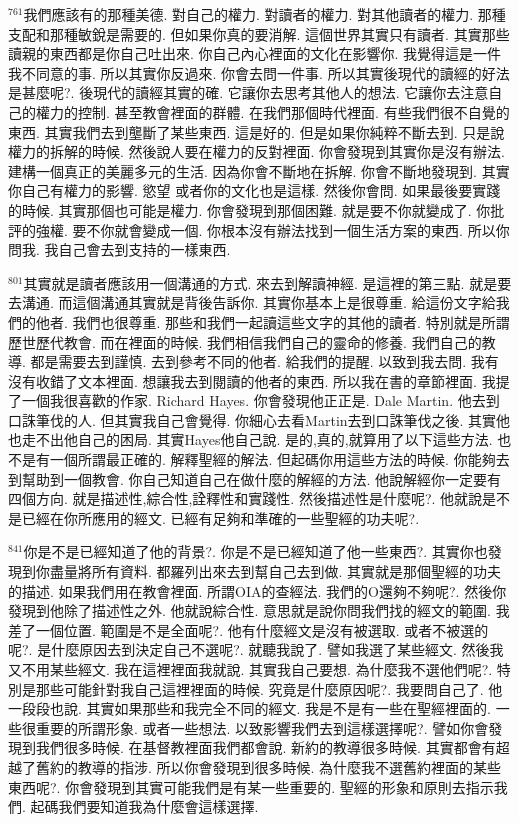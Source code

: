 \documentclass{book}
\begin{document}
$^{761}$我們應該有的那種美德.
對自己的權力.
對讀者的權力.
對其他讀者的權力.
那種支配和那種敏銳是需要的.
但如果你真的要消解.
這個世界其實只有讀者.
其實那些讀親的東西都是你自己吐出來.
你自己內心裡面的文化在影響你.
我覺得這是一件我不同意的事.
所以其實你反過來.
你會去問一件事.
所以其實後現代的讀經的好法是甚麼呢?.
後現代的讀經其實的確.
它讓你去思考其他人的想法.
它讓你去注意自己的權力的控制.
甚至教會裡面的群體.
在我們那個時代裡面.
有些我們很不自覺的東西.
其實我們去到壟斷了某些東西.
這是好的.
但是如果你純粹不斷去到.
只是說權力的拆解的時候.
然後說人要在權力的反對裡面.
你會發現到其實你是沒有辦法.
建構一個真正的美麗多元的生活.
因為你會不斷地在拆解.
你會不斷地發現到.
其實你自己有權力的影響.
慾望 或者你的文化也是這樣.
然後你會問.
如果最後要實踐的時候.
其實那個也可能是權力.
你會發現到那個困難.
就是要不你就變成了.
你批評的強權.
要不你就會變成一個.
你根本沒有辦法找到一個生活方案的東西.
所以你問我.
我自己會去到支持的一樣東西.

$^{801}$其實就是讀者應該用一個溝通的方式.
來去到解讀神經.
是這裡的第三點.
就是要去溝通.
而這個溝通其實就是背後告訴你.
其實你基本上是很尊重.
給這份文字給我們的他者.
我們也很尊重.
那些和我們一起讀這些文字的其他的讀者.
特別就是所謂歷世歷代教會.
而在裡面的時候.
我們相信我們自己的靈命的修養.
我們自己的教導.
都是需要去到謹慎.
去到參考不同的他者.
給我們的提醒.
以致到我去問.
我有沒有收錯了文本裡面.
想讓我去到閱讀的他者的東西.
所以我在書的章節裡面.
我提了一個我很喜歡的作家.
Richard Hayes.
你會發現他正正是.
Dale Martin.
他去到口誅筆伐的人.
但其實我自己會覺得.
你細心去看Martin去到口誅筆伐之後.
其實他也走不出他自己的困局.
其實Hayes他自己說.
是的,真的,就算用了以下這些方法.
也不是有一個所謂最正確的.
解釋聖經的解法.
但起碼你用這些方法的時候.
你能夠去到幫助到一個教會.
你自己知道自己在做什麼的解經的方法.
他說解經你一定要有四個方向.
就是描述性,綜合性,詮釋性和實踐性.
然後描述性是什麼呢?.
他就說是不是已經在你所應用的經文.
已經有足夠和準確的一些聖經的功夫呢?.

$^{841}$你是不是已經知道了他的背景?.
你是不是已經知道了他一些東西?.
其實你也發現到你盡量將所有資料.
都羅列出來去到幫自己去到做.
其實就是那個聖經的功夫的描述.
如果我們用在教會裡面.
所謂OIA的查經法.
我們的O還夠不夠呢?.
然後你發現到他除了描述性之外.
他就說綜合性.
意思就是說你問我們找的經文的範圍.
我差了一個位置.
範圍是不是全面呢?.
他有什麼經文是沒有被選取.
或者不被選的呢?.
是什麼原因去到決定自己不選呢?.
就聽我說了.
譬如我選了某些經文.
然後我又不用某些經文.
我在這裡裡面我就說.
其實我自己要想.
為什麼我不選他們呢?.
特別是那些可能針對我自己這裡裡面的時候.
究竟是什麼原因呢?.
我要問自己了.
他一段段也說.
其實如果那些和我完全不同的經文.
我是不是有一些在聖經裡面的.
一些很重要的所謂形象.
或者一些想法.
以致影響我們去到這樣選擇呢?.
譬如你會發現到我們很多時候.
在基督教裡面我們都會說.
新約的教導很多時候.
其實都會有超越了舊約的教導的指涉.
所以你會發現到很多時候.
為什麼我不選舊約裡面的某些東西呢?.
你會發現到其實可能我們是有某一些重要的.
聖經的形象和原則去指示我們.
起碼我們要知道我為什麼會這樣選擇.
\end{document}
